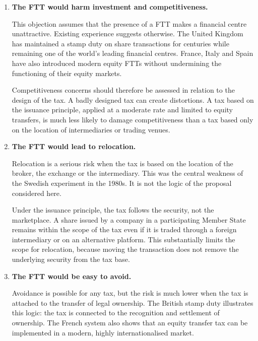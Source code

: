 \documentclass[../main]{subfiles}
\begin{document}
\begin{enumerate}
    For long-term investors, the cost of a small FTT is spread over the holding period and is therefore limited. In addition, if the tax reduces trading frequency, the increase in the unit cost of trading may be partly offset by a fall in the number of transactions. This is why the effect on firms' cost of capital is likely to be tiny (at best) for a moderate tax applied to liquid equity markets.

    \item \textbf{The FTT would harm investment and competitiveness.}

    This objection assumes that the presence of a FTT makes a financial centre unattractive. Existing experience suggests otherwise. The United Kingdom has maintained a stamp duty on share transactions for centuries while remaining one of the world's leading financial centres. France, Italy and Spain have also introduced modern equity FTTs without undermining the functioning of their equity markets.

    Competitiveness concerns should therefore be assessed in relation to the design of the tax. A badly designed tax can create distortions. A tax based on the issuance principle, applied at a moderate rate and limited to equity transfers, is much less likely to damage competitiveness than a tax based only on the location of intermediaries or trading venues.

    \item \textbf{The FTT would lead to relocation.}

    Relocation is a serious risk when the tax is based on the location of the broker, the exchange or the intermediary. This was the central weakness of the Swedish experiment in the 1980s. It is not the logic of the proposal considered here.

    Under the issuance principle, the tax follows the security, not the marketplace. A share issued by a company in a participating Member State remains within the scope of the tax even if it is traded through a foreign intermediary or on an alternative platform. This substantially limits the scope for relocation, because moving the transaction does not remove the underlying security from the tax base.

    \item \textbf{The FTT would be easy to avoid.}

    Avoidance is possible for any tax, but the risk is much lower when the tax is attached to the transfer of legal ownership. The British stamp duty illustrates this logic: the tax is connected to the recognition and settlement of ownership. The French system also shows that an equity transfer tax can be implemented in a modern, highly internationalised market.


\end{enumerate}
\end{document}

